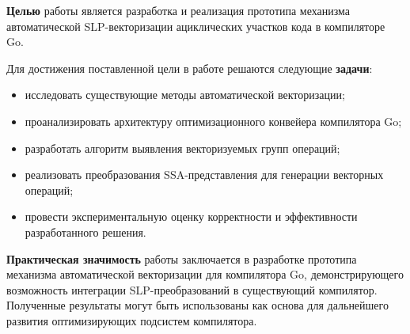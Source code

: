\textbf{Целью} работы является разработка и реализация прототипа механизма автоматической SLP-векторизации ациклических участков кода в компиляторе Go.

Для достижения поставленной цели в работе решаются следующие \textbf{задачи}:
\begin{itemize}
    \item исследовать существующие методы автоматической векторизации;
    \item проанализировать архитектуру оптимизационного конвейера компилятора Go;
    \item разработать алгоритм выявления векторизуемых групп операций;
    \item реализовать преобразования SSA-представления для генерации векторных операций;
    \item провести экспериментальную оценку корректности и эффективности разработанного решения.
\end{itemize}

\textbf{Практическая значимость} работы заключается в разработке прототипа механизма автоматической векторизации для компилятора Go, 
демонстрирующего возможность интеграции SLP-преобразований в существующий компилятор. Полученные результаты могут быть использованы как основа для дальнейшего развития оптимизирующих подсистем компилятора.
